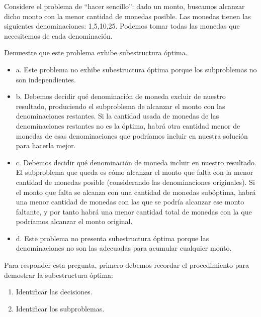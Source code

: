 





\begin{cajita}
    Considere el problema de “hacer sencillo”: dado un monto, buscamos alcanzar dicho monto con la menor cantidad de monedas posible. Las monedas tienen las siguientes denominaciones: {1,5,10,25}. Podemos tomar todas las monedas que necesitemos de cada denominación.
\end{cajita}

\begin{problema}
    Demuestre que este problema exhibe subestructura óptima.
    \begin{itemize}
        \item a. Este problema no exhibe subestructura óptima porque los subproblemas no son
        independientes.
        \item b. Debemos decidir qué denominación de moneda excluir de nuestro resultado, produciendo
        el subproblema de alcanzar el monto con las denominaciones restantes. Si la cantidad usada de monedas de las denominaciones restantes no es la óptima, habrá otra cantidad menor de monedas de esas denominaciones que podríamos incluir en nuestra solución para hacerla mejor.
        \item c. Debemos decidir qué denominación de moneda incluir en nuestro resultado. El subproblema que queda es cómo alcanzar el monto que falta con la menor cantidad de monedas posible (considerando las denominaciones originales). Si el monto que falta se alcanza con una cantidad de monedas subóptima, habrá una menor cantidad de monedas con las que se podría alcanzar ese monto faltante, y por tanto habrá una menor cantidad total de monedas con la que podríamos alcanzar el monto original.
        \item d. Este problema no presenta subestructura óptima porque las denominaciones no son las adecuadas para acumular cualquier monto.
    \end{itemize}
    \begin{sol}
        Para responder esta pregunta, primero debemos recordar el procedimiento para demostrar la subestructura óptima: 
        \begin{enumerate}
            \item Identificar las decisiones. 
            \item Identificar los subproblemas.

\end{enumerate}
\end{sol}
\end{problema}
